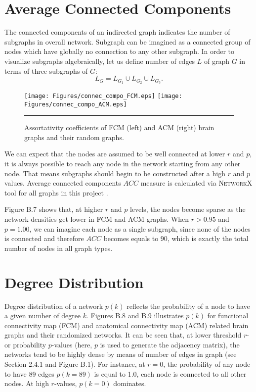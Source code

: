 \section{Average Connected Components}
The connected components of an indirected graph indicates the number of subgraphs in overall network. Subgraph can be imagined as a connected group of nodes which have globally no connection to any other subgraph. In order to visualize subgraphs algebraically, let us define number of edges $L$ of graph $G$ in terms of three subgraphs of $G$:
\begin{equation}
L_G = L_{G_1}\cup L_{G_2}\cup L_{G_3} . 
\end{equation} 

\begin{figure}[htbp]
 
  \centering
	 \texttt{[image: Figures/connec\_compo\_FCM.eps]}
	 \texttt{[image: Figures/connec\_compo\_ACM.eps]}
	\rule{35em}{0.5pt} 
  \caption[Average Connected Components]{Assortativity coefficients of FCM (left) and ACM (right) brain graphs and their random graphs.} 
    \label{fig:Average Connected Components}
 	
\end{figure}

We can expect that the nodes are assumed to be well connected at lower $r$ and $p$, it is always possible to reach any node in the network starting from any other node. That means subgraphs should begin to be constructed after a high $r$ and $p$ values. Average connected components $ACC$ measure is calculated via \textsc{NetworkX} tool for all graphs in this project \citep{XYZNETW}.

Figure B.7 shows that, at higher $r$ and $p$ levels, the nodes become sparse as the network densities get lower in FCM and ACM graphs. When $r>0.95$ and $p=1.00$, we can imagine each node as a single subgraph, since none of the nodes is connected and therefore $ACC$ becomes equals to 90, which is exactly the total number of nodes in all graph types. 


\section{Degree Distribution}
Degree distribution of a network $p(k)$ reflects the probability of a node to have a given number of degree $k$. Figures B.8 and B.9 illustrates $p(k)$ for functional connectivity map (FCM) and anatomical connectivity map (ACM) related brain graphs and their randomized networks. It can be seen that, at lower threshold $r$- or probability $p$-values (here, $p$ is used to generate the adjacency matrix), the networks tend to be highly dense by means of number of edges in graph (see Section 2.4.1 and Figure B.1). For instance, at $r=0$, the probability of any node to have 89 edges $p(k=89)$ is equal to 1.0, each node is connected to all other nodes. At high $r$-values, $p(k=0)$ dominates.    

